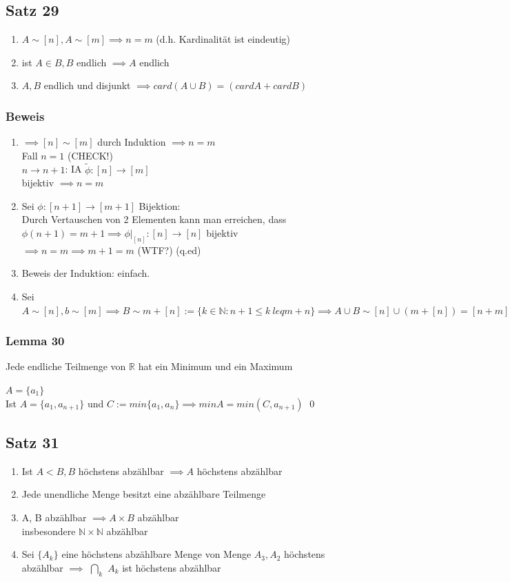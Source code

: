 \documentclass[fleqn]{scrbook}
\newcommand{\R}{\mathbb{R}}
\newcommand{\N}{\mathbb{N}}
\renewenvironment{proof}{{\bfseries Beweis }}{\qed}
\begin{document}
\subsection{Satz 29}
\begin{enumerate}[1)]
\item $A\sim [n], A\sim [m] \implies n = m$ (d.h. Kardinalität ist eindeutig)
\item ist $A \in B, B$ endlich $\implies A$ endlich
\item $A, B$ endlich und disjunkt $\implies card(A\cup B) = (cardA + cardB)$
\end{enumerate}
\subsubsection{Beweis}
\begin{enumerate}[1)]
\item $\implies [n] \sim [m]$ durch Induktion $\implies n = m$\\Fall $n = 1$ (CHECK!)\\$n\rightarrow n + 1$: IA $\tilde{\phi}:[n]\rightarrow [m]$\\bijektiv $\implies n = m$\item Sei $\phi:[n+1]\rightarrow[m+1]$ Bijektion:\\Durch Vertauschen von 2 Elementen kann man erreichen, dass $\phi (n + 1) = m+1 \implies \phi |_{[n]}:[n]\rightarrow [n]$ bijektiv $\implies n = m \implies  m + 1 = m$ (WTF?) (q.ed)
\item Beweis der Induktion: einfach.
\item Sei $A \sim [n], b \sim [m] \implies B \sim m + [n] := \{ k \in \N: n + 1 \leq k \ leq m + n \} \implies A \cup B \sim [n] \cup (m + [n]) = [n + m]$
\end{enumerate}
\subsubsection{Lemma 30} Jede endliche Teilmenge von $\R$ hat ein Minimum und ein Maximum

\begin{proof}
$A = \{a_1\}$\\Ist $A = \{a_1, a_{n+1}\}$ und $C:= min\{a_1, a_n\} \implies minA = min(C, a_{n+1})$
\end{proof}
\subsection{Satz 31}
\begin{enumerate}[1)]
\item Ist $A<B,B$ höchstens abzählbar $\implies A$ höchstens abzählbar
\item Jede unendliche Menge besitzt eine abzählbare Teilmenge
\item A, B abzählbar $\implies A \times B$ abzählbar\\ insbesondere $\N \times \N$ abzählbar
\item Sei $\{A_k\}$ eine höchstens abzählbare Menge von Menge $A_3, A_2$ höchstens abzählbar $\implies$ $\bigcap_k$ $A_k$ ist höchstens abzählbar
\end{enumerate}
\end{document}

